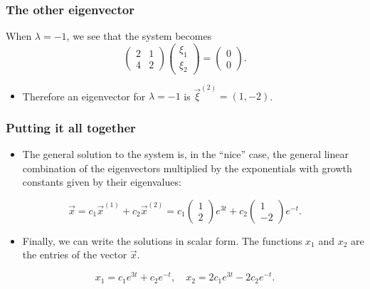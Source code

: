 \begin{frame}

\frametitle{The other eigenvector}
\label{theothereigenvector}

When $ \lambda = -1 $, we see that the system becomes
\[
    \begin{pmatrix}
        2 & 1 \\
        4 & 2
    \end{pmatrix} \begin{pmatrix} \xi_1 \\ \xi_2 \end{pmatrix} = \begin{pmatrix} 0 \\ 0 \end{pmatrix}.
\]

\begin{itemize}
\item Therefore an eigenvector for $ \lambda = -1 $ is $ \vec{\xi}^{(2)} = (1, -2)$.

\end{itemize}

\end{frame}

\begin{frame}

\frametitle{Putting it all together}
\label{puttingitalltogether}

\begin{itemize}
\item The general solution to the system is, in the ``nice'' case, the general linear combination of the eigenvectors multiplied by the exponentials with growth constants given by their eigenvalues:

\end{itemize}

\[
    \vec{x} = c_1 \vec{x}^{(1)} + c_2 \vec{x}^{(2)} = c_1 \begin{pmatrix} 1 \\ 2 \end{pmatrix} e^{3t} + c_2 \begin{pmatrix} 1 \\ -2 \end{pmatrix} e^{-t}.
\]

\begin{itemize}
\item Finally, we can write the solutions in scalar form. The functions $ x_1  $ and $ x_2 $ are the entries of the vector $ \vec{x} $.

\end{itemize}

\[
    x_1 = c_1 e^{3t} + c_2 e^{-t}, \quad x_2 = 2c_1 e^{3t} - 2c_2 e^{-t}.
\]

\end{frame}

